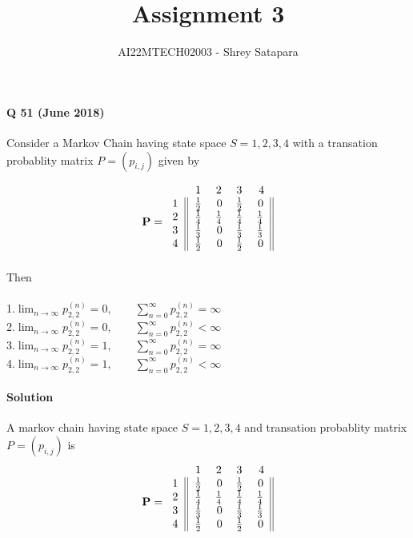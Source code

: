 \documentclass{article}
\title{Assignment 3}
\author{AI22MTECH02003 - Shrey Satapara}
\begin{document}
\maketitle

\paragraph{Q 51 (June 2018)}
Consider a Markov Chain having state space \(S = {1,2,3,4}\) with a transation probablity matrix \(P = (p_{i,j})\) given by 


\[
\mathbf{P} = 
        \begin{blockarray}{ccccc}
         & 1   & 2   & 3 & 4 \\
        \begin{block}{r||rrrr||}
        1 & \frac{1}{2} & 0 & \frac{1}{2} & 0\\
        2 & \frac{1}{4} & \frac{1}{4} & \frac{1}{4} & \frac{1}{4}\\
        3 & \frac{1}{3}   & 0   & \frac{1}{3}   & \frac{1}{3}\\
        4 & \frac{1}{2}   & 0   & \frac{1}{2}   & 0\\
        \end{block}
    \end{blockarray}
\] Then \\\\
1.\quad \( \lim_{n\to\infty} p_{2,2}^{(n)} = 0, \quad\quad \sum_{n=0}^{\infty} p_{2,2}^{(n)} = \infty \)
\\
2.\quad \( \lim_{n\to\infty} p_{2,2}^{(n)} = 0, \quad\quad \sum_{n=0}^{\infty} p_{2,2}^{(n)} < \infty \)
\\
3.\quad \( \lim_{n\to\infty} p_{2,2}^{(n)} = 1, \quad\quad \sum_{n=0}^{\infty} p_{2,2}^{(n)} = \infty \)
\\
4.\quad \( \lim_{n\to\infty} p_{2,2}^{(n)} = 1, \quad\quad \sum_{n=0}^{\infty} p_{2,2}^{(n)} < \infty \)

\paragraph{Solution}
A markov chain having state space \(S = {1,2,3,4}\) and transation probablity matrix \(P = (p_{i,j})\) is 
\[
\mathbf{P} = 
        \begin{blockarray}{ccccc}
         & 1   & 2   & 3 & 4 \\
        \begin{block}{r||rrrr||}
        1 & \frac{1}{2} & 0 & \frac{1}{2} & 0\\
        2 & \frac{1}{4} & \frac{1}{4} & \frac{1}{4} & \frac{1}{4}\\
        3 & \frac{1}{3}   & 0   & \frac{1}{3}   & \frac{1}{3}\\
        4 & \frac{1}{2}   & 0   & \frac{1}{2}   & 0\\
        \end{block}
    \end{blockarray}
\]
\end{document}
